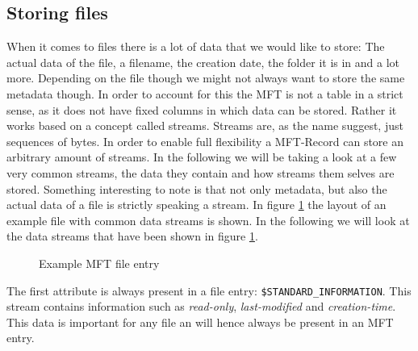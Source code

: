 \subsection{Storing files}
When it comes to files there is a lot of data that we would like to store: The actual data of the file, a filename, the creation date, the folder it is in and a lot more. Depending on the file though we might not always want to store the same metadata though. In order to account for this the MFT is not a table in a strict sense, as it does not have fixed columns in which data can be stored. Rather it works based on a concept called streams. Streams are, as the name suggest, just sequences of bytes. In order to enable full flexibility a MFT-Record can store an arbitrary amount of streams. In the following we will be taking a look at a few very common streams, the data they contain and how streams them selves are stored. Something interesting to note is that not only metadata, but also the actual data of a file is strictly speaking a stream. In figure \ref{fig:mft_entry} the layout of an example file with common data streams is shown. In the following we will look at the data streams that have been shown in figure \ref{fig:mft_entry}.
\begin{figure}[H]
	\centering
	\caption{Example MFT file entry\label{fig:mft_entry}}
\end{figure}
The first attribute is always present in a file entry: \texttt{\$STANDARD\_INFORMATION}. This stream contains information such as \textit{read-only}, \textit{last-modified} and \textit{creation-time}. This data is important for any file an will hence always be present in an MFT entry.\cite{RUSSINOVICH_ET_AL:2012:WI}\\
